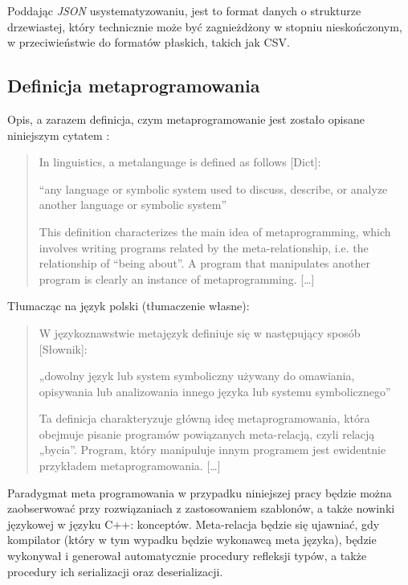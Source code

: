 \documentclass[12pt]{article}
\newcommand{\n}{\newline}
\newcommand{\nonpl}[1]{{\it #1}}
\newcommand{\JSON}{\nonpl{JSON} }
\begin{document}
{{			Poddając \JSON usystematyzowaniu, jest to format danych o strukturze drzewiastej, który technicznie
			może być zagnieżdżony w stopniu nieskończonym, w przeciwieństwie do formatów płaskich, takich jak CSV.\n
		}

		{
			\subsection{Definicja metaprogramowania}

			Opis, a zarazem definicja, czym metaprogramowanie jest zostało opisane niniejszym cytatem \cite{metaprogramming_definition}:

			\begin{quotation}
					In linguistics, a metalanguage is defined as follows [Dict]:\n

				“any language or symbolic system used to discuss, describe, or analyze another
					language or symbolic system”\n

					This definition characterizes the main idea of metaprogramming, which involves writing
				programs related by the meta-relationship, i.e. the relationship of “being about”. A program that
				manipulates another program is clearly an instance of metaprogramming. [\ldots]
			\end{quotation}

			\newpage
			{\noindent Tłumacząc na język polski (tłumaczenie własne):}

			\begin{quotation}
					W językoznawstwie metajęzyk definiuje się w następujący sposób [Słownik]:\n

				„dowolny język lub system symboliczny używany do omawiania, opisywania lub analizowania
					innego języka lub systemu symbolicznego”\n

					Ta definicja charakteryzuje główną ideę metaprogramowania, która obejmuje pisanie
				programów powiązanych meta-relacją, czyli relacją „bycia”. Program, który
				manipuluje innym programem jest ewidentnie przykładem metaprogramowania. [\ldots]
			\end{quotation}

			Paradygmat meta programowania w przypadku niniejszej pracy będzie można zaobserwować przy
			rozwiązaniach z zastosowaniem szablonów, a także nowinki językowej w języku C++: konceptów.
			Meta-relacja będzie się ujawniać, gdy kompilator (który w tym wypadku będzie wykonawcą meta języka),
			będzie wykonywał i generował automatycznie procedury refleksji typów, a także procedury ich serializacji
			oraz deserializacji.\n
		}

}
\end{document}
